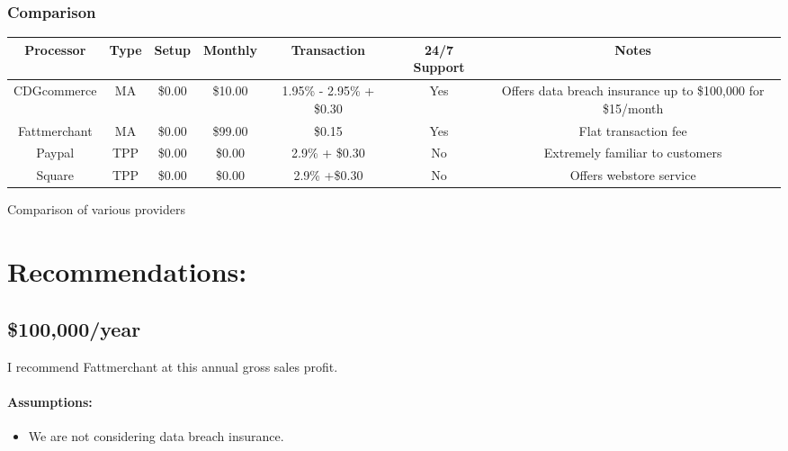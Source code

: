 \documentclass[letterpaper]{article}
\begin{document}
      \subsubsection{Comparison}
        \begin{center}
         \centering
         \begin{tabular}{||c c c c c c c||}
         \hline
         Processor & Type & Setup & Monthly & Transaction & 24/7 Support & Notes\\ [0.5ex]
         \hline\hline
         CDGcommerce & MA & \$0.00 & \$10.00 & 1.95\% - 2.95\% + \$0.30 & Yes & Offers data breach insurance up to \$100,000 for \$15/month\\
         Fattmerchant & MA & \$0.00 & \$99.00 & \$0.15 & Yes & Flat transaction fee\\
         Paypal & TPP & \$0.00 & \$0.00 & 2.9\% + \$0.30 & No & Extremely familiar to customers\\
         Square & TPP & \$0.00 & \$0.00 & 2.9\% +\$0.30 & No & Offers webstore service\\ [1ex]
         \hline
        \end{tabular}
        \caption{Comparison of various providers}
        \label{table:1}
      \end{center}

  \section{Recommendations:}
    \subsection{\$100,000/year}
      I recommend Fattmerchant at this annual gross sales profit.
      \paragraph{Assumptions:}
        \begin{itemize}
          \item We are not considering data breach insurance.
        \end{itemize}
\end{document}
